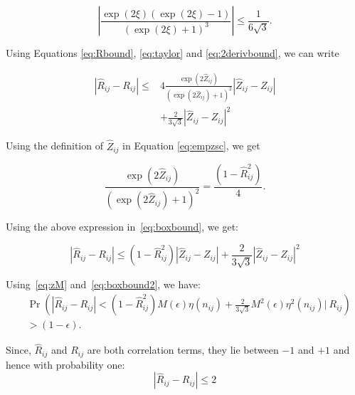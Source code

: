 \begin{equation}\label{eq:2derivbound}
\left |\frac{\exp(2\xi){\left( \exp(2\xi) - 1 \right)}}{\left (\exp(2\xi) + 1 \right )^3} \right | \leq \frac{1}{6 \sqrt{3}}.
\end{equation}

\smallskip


Using Equations \eqref{eq:Rbound}, \eqref{eq:taylor} and \eqref{eq:2derivbound}, we can write

\begin{equation}\label{eq:boxbound}
\begin{aligned}
| \hat{R}_{ij} - R_{ij} |  \leq& 4 \frac{\exp(2 \hat{Z}_{ij})}{(\exp(2 \hat{Z}_{ij}) + 1)^2} | \hat{Z}_{ij} - Z_{ij} | \\
& + \frac{2}{3\sqrt{3}} | \hat{Z}_{ij} - Z_{ij} |^2
\end{aligned}
\end{equation}

Using the definition of $\hat{Z}_{ij}$ in Equation \eqref{eq:empzsc}, we get

\begin{equation}
    \frac{\exp(2 \hat{Z}_{ij})}{(\exp(2 \hat{Z}_{ij}) + 1)^2} = \frac{(1 - \hat{R}^2_{ij})}{4}. 
\end{equation}

Using the above expression in~\eqref{eq:boxbound}, we get: 

\begin{equation}\label{eq:boxbound2}
| \hat{R}_{ij} - R_{ij} |  \leq (1 - \hat{R}^2_{ij}) | \hat{Z}_{ij} - Z_{ij} | + \frac{2}{3\sqrt{3}} | \hat{Z}_{ij} - Z_{ij} |^2
\end{equation}


Using~\eqref{eq:zM} and~\eqref{eq:boxbound2}, we have:
\begin{equation*}
\begin{aligned}
    &\Pr \left (  | \hat{R}_{ij} - R_{ij} | < (1 - \hat{R}^2_{ij})M(\epsilon)\eta(n_{ij}) +\frac{2}{3\sqrt{3}} M^2(\epsilon)\eta^2(n_{ij}) \bigg |~R_{ij} \right )\\
    & > (1 - \epsilon).
    \end{aligned}
\end{equation*}

Since, $\hat{R}_{ij}$ and $R_{ij}$ are both correlation terms, they lie between $-1$ and $+1$ and hence with probability one:
\begin{equation}\label{eq:naturalboxbound}
| \hat{R}_{ij} - R_{ij} |  \leq 2
\end{equation}

